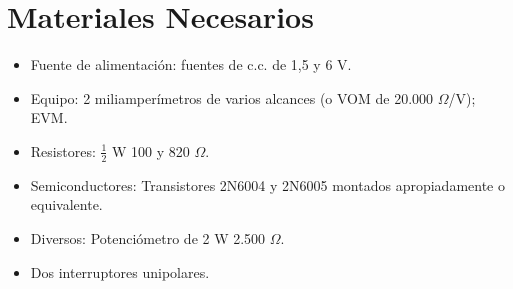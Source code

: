 \documentclass[a4paper,12pt]{article}
\begin{document}

\section{Materiales Necesarios}
\begin{itemize}
    \item Fuente de alimentación: fuentes de c.c. de 1,5 y 6 V.
    \item Equipo: 2 miliamperímetros de varios alcances (o VOM de 20.000 \(\Omega\)/V); EVM.
    \item Resistores: \( \frac{1}{2} \) W 100 y 820 \(\Omega\).
    \item Semiconductores: Transistores 2N6004 y 2N6005 montados apropiadamente o equivalente.
    \item Diversos: Potenciómetro de 2 W 2.500 \(\Omega\).
    \item Dos interruptores unipolares.
\end{itemize}
\end{document}
